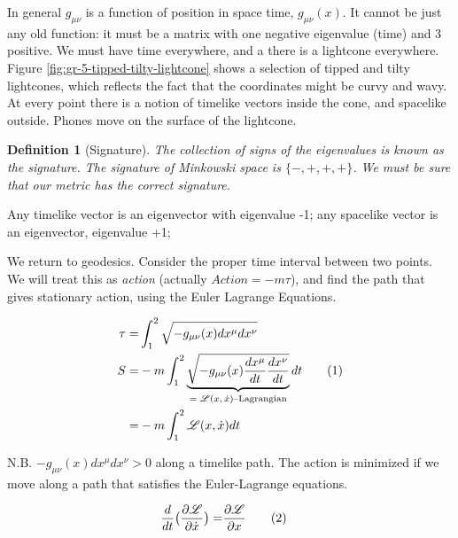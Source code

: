 \documentclass[]{article}
\newcommand\numberthis{\addtocounter{equation}{1}\tag{\theequation}}
\newcommand{\Lagr}{\mathscr{L}}
\newtheorem{defn}[thm]{Definition}
\begin{document}
{In general $g_{\mu\nu}$ is a function of position in space time, $g_{\mu\nu}(x)$. It cannot be just any old function: it must be a matrix with one negative eigenvalue (time) and 3 positive. We must have time everywhere, and a there is a lightcone everywhere. Figure \ref{fig:gr-5-tipped-tilty-lightcone} shows a selection of tipped and tilty lightcones, which reflects the fact that the coordinates might be curvy and wavy. At every point there is a notion of timelike vectors inside the cone, and spacelike outside. Phones move on the surface of the lightcone.

\begin{defn}[Signature]
	The collection of signs of the eigenvalues is known as the signature. The signature of Minkowski space is $\{-,+,+,+\}$. We must be sure that our metric has the correct signature.
\end{defn}

Any timelike vector is an eigenvector with eigenvalue -1; any spacelike vector is an eigenvector, eigenvalue +1;

We return to geodesics. Consider the proper time interval between two points. We will treat this as \emph{action} (actually $Action=-m\tau$), and find the path that gives stationary action, using the Euler Lagrange Equations\cite{susskind2013quantum}.

\begin{align*}
	\tau =& \int_{1}^{2} \sqrt{-g_{\mu\nu}(x) dx^\mu dx^\nu } \\
	S =& -m \int_{1}^{2} \underbrace{\sqrt{-g_{\mu\nu}(x) \frac{dx^\mu}{dt} \frac{dx^\nu}{dt} }}_\text{$=\Lagr(x,\dot{x})$--Lagrangian}  dt \numberthis \label{eq:action:g}\\
	=& -m \int_{1}^{2} \Lagr(x,\dot{x}) dt
\end{align*}

 N.B. $-g_{\mu\nu}(x) dx^\mu dx^\nu>0$ along a timelike path. The action is minimized if we move along a path that satisfies the Euler-Lagrange equations.
 
\begin{align*}
 	\frac{d}{dt}\big(\frac{\partial \Lagr}{\partial \dot{x}}\big) =& \frac{\partial \Lagr}{\partial x} \numberthis \label{eq:euler:lagrange}
\end{align*}

}
\end{document}
